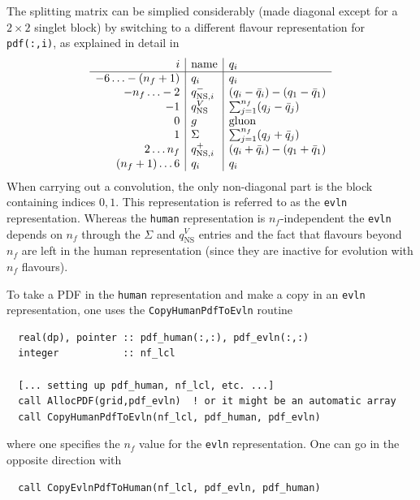 \documentclass[12pt]{article}
\newcommand{\ttt}[1]{\texttt{#1}}
\begin{document}
The splitting matrix can be simplied considerably (made diagonal
except for a $2\times2$ singlet block) by switching to a different
flavour representation for \ttt{pdf(:,i)}, as explained in detail in
\cite{vanNeerven:1999ca,vanNeerven:2000uj}
\begin{equation}
  \label{eq:diag_split}
  \begin{array}{r | l| l }
     i & \mbox{name} & q_i \\ \hline
      -6\ldots-(n_f+1) & q_i & q_i\\
     -n_f\ldots -2 & q_{\mathrm{NS},i}^{-} & (q_i -  {\bar q}_i) - (q_1 - {\bar q}_1)\\
      -1           & q_{\mathrm{NS}}^{V} & \sum_{j=1}^{n_f} (q_j -  {\bar q}_j)\\
       0           & g & \textrm{gluon} \\
       1           & \Sigma & \sum_{j=1}^{n_f} (q_j +  {\bar q}_j)\\
     2\ldots n_f & q_{\mathrm{NS},i}^{+} & (q_i +  {\bar q}_i) - (q_1 + {\bar q}_1)\\
      (n_f+1)\ldots6 & q_i & q_i
  \end{array}
\end{equation}
When carrying out a convolution, the only non-diagonal part is the
block containing indices $0,1$. This representation is referred to as
the \ttt{evln} representation. Whereas the \ttt{human} representation
is $n_f$-independent the \ttt{evln} depends on $n_f$ through the
$\Sigma$ and $q_{\mathrm{NS}}^{V}$ entries and the fact that flavours
beyond $n_f$ are left in the human representation (since they are
inactive for evolution with $n_f$ flavours).

To take a PDF in the \ttt{human} representation and make a copy in an
\ttt{evln} representation, one uses the \ttt{CopyHumanPdfToEvln} routine
\begin{verbatim}
  real(dp), pointer :: pdf_human(:,:), pdf_evln(:,:)
  integer           :: nf_lcl

  [... setting up pdf_human, nf_lcl, etc. ...] 
  call AllocPDF(grid,pdf_evln)  ! or it might be an automatic array
  call CopyHumanPdfToEvln(nf_lcl, pdf_human, pdf_evln)
\end{verbatim}
where one specifies the $n_f$ value for the \ttt{evln} representation.
One can go in the opposite direction with
\begin{verbatim}
  call CopyEvlnPdfToHuman(nf_lcl, pdf_evln, pdf_human)
\end{verbatim}
\end{document}
